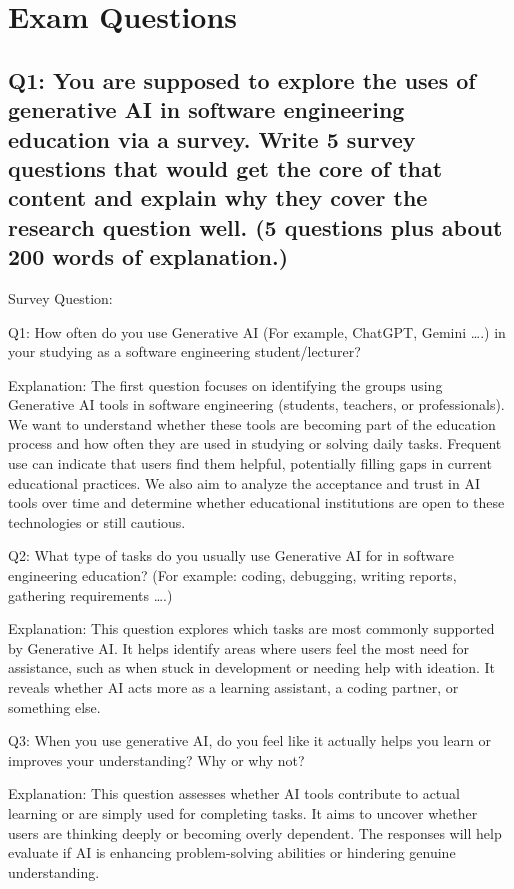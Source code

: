 \section*{Exam Questions}

\subsection*{Q1: You are supposed to explore the uses of generative AI in software engineering education via a survey. Write 5 survey questions that would get the core of that content and explain why they cover the research question well. (5 questions plus about 200 words of explanation.)}

Survey Question:

Q1: How often do you use Generative AI (For example, ChatGPT, Gemini ….) in your studying as a software engineering student/lecturer?

Explanation:
The first question focuses on identifying the groups using Generative AI tools in software engineering (students, teachers, or professionals). We want to understand whether these tools are becoming part of the education process and how often they are used in studying or solving daily tasks. Frequent use can indicate that users find them helpful, potentially filling gaps in current educational practices. We also aim to analyze the acceptance and trust in AI tools over time and determine whether educational institutions are open to these technologies or still cautious.

Q2: What type of tasks do you usually use Generative AI for in software engineering education? (For example: coding, debugging, writing reports, gathering requirements ….)

Explanation:
This question explores which tasks are most commonly supported by Generative AI. It helps identify areas where users feel the most need for assistance, such as when stuck in development or needing help with ideation. It reveals whether AI acts more as a learning assistant, a coding partner, or something else.

Q3: When you use generative AI, do you feel like it actually helps you learn or improves your understanding? Why or why not?

Explanation:
This question assesses whether AI tools contribute to actual learning or are simply used for completing tasks. It aims to uncover whether users are thinking deeply or becoming overly dependent. The responses will help evaluate if AI is enhancing problem-solving abilities or hindering genuine understanding.

